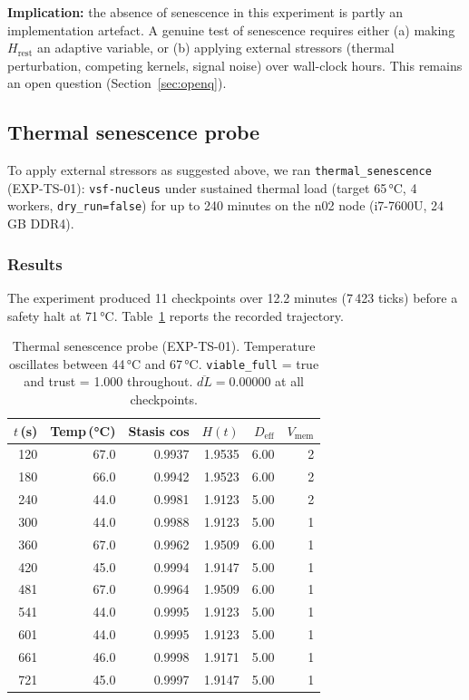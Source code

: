 \documentclass[11pt, a4paper]{article}
\newcommand{\nucleus}{\texttt{vsf-nucleus}}
\begin{document}
\textbf{Implication:} the absence of senescence in this experiment
is partly an implementation artefact.
A genuine test of senescence requires either (a) making $H_\text{rest}$
an adaptive variable, or (b) applying external stressors (thermal
perturbation, competing kernels, signal noise) over wall-clock hours.
This remains an open question (Section~\ref{sec:openq}).

\subsection{Thermal senescence probe}
\label{sec:thermalsenescence}

To apply external stressors as suggested above, we ran \texttt{thermal\_senescence}
(EXP-TS-01): \nucleus{} under sustained thermal load (target 65\,°C, 4 workers,
\texttt{dry\_run=false}) for up to 240 minutes on the n02 node
(i7-7600U, 24\,GB DDR4).

\subsubsection*{Results}

The experiment produced 11 checkpoints over 12.2 minutes (7\,423 ticks) before a
safety halt at 71\,°C.
Table~\ref{tab:thermal_senescence} reports the recorded trajectory.

\begin{table}[h]
\centering
\small
\begin{tabular}{rrrrrr}
\toprule
$t$\,(s) & Temp\,(°C) & Stasis cos & $H(t)$ & $D_\text{eff}$ & $V_\text{mem}$ \\
\midrule
120 & 67.0 & 0.9937 & 1.9535 & 6.00 & 2 \\
180 & 66.0 & 0.9942 & 1.9523 & 6.00 & 2 \\
240 & 44.0 & 0.9981 & 1.9123 & 5.00 & 2 \\
300 & 44.0 & 0.9988 & 1.9123 & 5.00 & 1 \\
360 & 67.0 & 0.9962 & 1.9509 & 6.00 & 1 \\
420 & 45.0 & 0.9994 & 1.9147 & 5.00 & 1 \\
481 & 67.0 & 0.9964 & 1.9509 & 6.00 & 1 \\
541 & 44.0 & 0.9995 & 1.9123 & 5.00 & 1 \\
601 & 44.0 & 0.9995 & 1.9123 & 5.00 & 1 \\
661 & 46.0 & 0.9998 & 1.9171 & 5.00 & 1 \\
721 & 45.0 & 0.9997 & 1.9147 & 5.00 & 1 \\
\bottomrule
\end{tabular}
\caption{Thermal senescence probe (EXP-TS-01).
Temperature oscillates between 44\,°C and 67\,°C.
\texttt{viable\_full} = true and trust = 1.000 throughout.
$\overline{dL} = 0.00000$ at all checkpoints.}
\label{tab:thermal_senescence}
\end{table}
\end{document}
